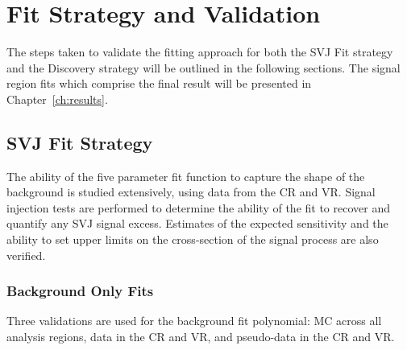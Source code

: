 \section{Fit Strategy and Validation}
\label{sec:fit_strategy}

The steps taken to validate the fitting approach for both the SVJ Fit strategy and the Discovery strategy will be outlined in the following sections. The signal region fits which comprise the final result will be presented in Chapter~\ref{ch:results}.

\subsection{SVJ Fit Strategy}
\label{subsec:fit_exclusion}

The ability of the five parameter fit function to capture the shape of the background is studied extensively, using data from the CR and VR. Signal injection tests are performed to determine the ability of the fit to recover and quantify any SVJ signal excess. Estimates of the expected sensitivity and the ability to set upper limits on the cross-section of the signal process are also verified.


\subsubsection{Background Only Fits}
\label{subsec:fit_bkgonly}

Three validations are used for the background fit polynomial: MC across all analysis regions, data in the CR and VR, and pseudo-data in the CR and VR. 

